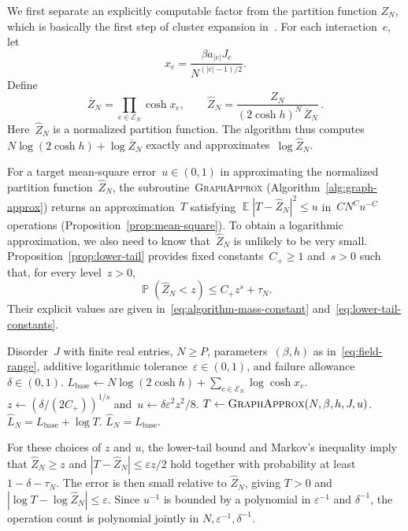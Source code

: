 \documentclass[letterpaper,11pt,reqno]{amsart}
\renewcommand{\leq}{\leqslant}
\renewcommand{\geq}{\geqslant}
\DeclareMathOperator{\E}{\mathds{E}}
\DeclareMathOperator{\pr}{\mathds{P}}
\begin{document}
We first separate an explicitly computable factor from the partition function $Z_N$, which is basically the first step of cluster expansion in~\cite{ALR87,DW23,DW26}. For each interaction~$e$, let
\begin{equation*}
x_e=\frac{\beta a_{|e|}J_e}{N^{(|e|-1)/2}}.
\end{equation*}
Define
\begin{equation}\label{eq:algorithm-normalization}
\overline Z_N=\prod_{e\in\mathcal E_N}\cosh x_e,
\qquad \widehat Z_N=\frac{Z_N}{(2\cosh h)^N\,\overline Z_N}\,.
\end{equation}
Here~$\widehat Z_N$ is a normalized partition function. The algorithm thus computes~$N\log(2\cosh h)+\log\overline Z_N$ exactly and approximates~$\log\widehat Z_N$.

For a target mean-square error~$u\in(0,1)$ in approximating the normalized partition function~$\widehat Z_N$, the subroutine~\textsc{GraphApprox} (Algorithm~\ref{alg:graph-approx}) returns an approximation~$T$ satisfying
\(
\E|T-\widehat Z_N|^2\leq u
\)
in~$CN^Cu^{-C}$ operations (Proposition~\ref{prop:mean-square}). To obtain a logarithmic approximation, we also need to know that~$\widehat Z_N$ is unlikely to be very small. Proposition~\ref{prop:lower-tail} provides fixed constants~$C_+\geq1$ and~$s>0$ such that, for every level~$z>0$,
\begin{equation*}
\pr(\widehat Z_N<z)\leq C_+z^s+\tau_N.
\end{equation*}
Their explicit values are given in~\eqref{eq:algorithm-mass-constant} and~\eqref{eq:lower-tail-constants}.

\begin{algorithm}[!htbp]
\caption{\textsc{LogApprox}$(N,\beta,h,J,\varepsilon,\delta)$}\label{alg:log-approx}
\begin{algorithmic}[1]
\Require Disorder~$J$ with finite real entries, $N\geq P$, parameters~$(\beta,h)$ as in~\eqref{eq:field-range}, additive logarithmic tolerance~$\varepsilon\in(0,1)$, and failure allowance~$\delta\in(0,1)$.
\State $L_{\mathrm{base}}\gets N\log(2\cosh h)+\sum_{e\in\mathcal E_N}\log\cosh x_e$.
\State $z\gets(\delta/(2C_+))^{1/s}$ and~$u\gets\delta\varepsilon^2z^2/8$.
\State $T\gets\textsc{GraphApprox}(N,\beta,h,J,u)$.
\State \Return $\widehat L_N=L_{\mathrm{base}}+\log T$.
\Else
\State \Return $\widehat L_N=L_{\mathrm{base}}$.
\EndIf
\end{algorithmic}
\end{algorithm}


For these choices of $z$ and $u$, the lower-tail bound and Markov’s inequality imply that $\widehat Z_N\geq z$ and $|T-\widehat Z_N|\leq\varepsilon z/2$ hold together with probability at least $1-\delta-\tau_N$. The error is then small relative to $\widehat Z_N$, giving $T>0$ and $|\log T-\log\widehat Z_N|\leq\varepsilon$. Since $u^{-1}$ is bounded by a polynomial in $\varepsilon^{-1}$ and $\delta^{-1}$, the operation count is polynomial jointly in $N,\varepsilon^{-1},\delta^{-1}$.
\end{document}
